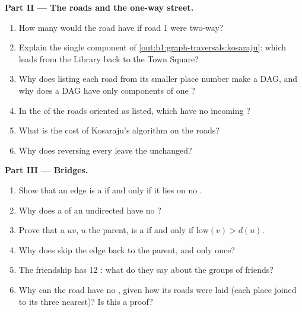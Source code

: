 \begin{problem}
\medskip\noindent\textbf{Part II --- The roads and the one-way street.}
\begin{enumerate}[resume]
\item How many  would the road  have if road 1 were two-way?
\item Explain the single component of \cref{out:b1:graph-traversals:kosaraju}: which  leads from the Library back
to the Town Square?
\item Why does listing each road from its smaller place number make a DAG, and why does a DAG have only components of one
?
\item In the  of the roads oriented as listed, which  have no incoming ?
\item What is the cost of Kosaraju's algorithm on the roads?
\item Why does reversing every  leave the  unchanged?
\end{enumerate}

\medskip\noindent\textbf{Part III --- Bridges.}
\begin{enumerate}[resume]
\item Show that an edge is a  if and only if it lies on no .
\item Why does a  of an undirected  have no ?
\item Prove that a  $u v$, $u$ the parent, is a  if and only if $\mathrm{low}(v) > d(u)$.
\item Why does  skip the edge back to the parent, and only once?
\item The friendship  has 12 : what do they say about the groups of friends?
\item Why can the road  have no , given how its roads were laid (each place joined to its three nearest)? Is
this a proof?
\end{enumerate}


\end{problem}
